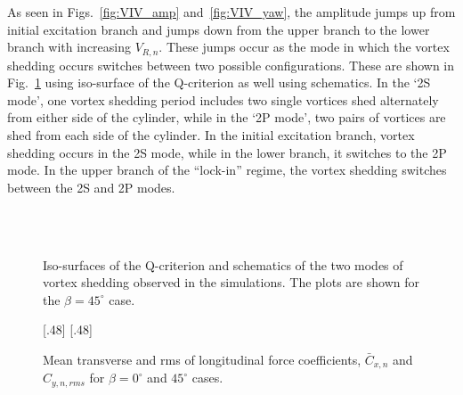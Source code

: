 As seen in Figs.~\ref{fig:VIV_amp} and~\ref{fig:VIV_yaw}, the amplitude jumps
up from initial excitation branch and jumps down from the upper branch to the
lower branch with increasing $V_{R,n}$. These jumps occur as the mode in which
the vortex shedding occurs switches between two possible configurations. These
are shown in Fig.~\ref{fig:VIV_Q} using iso-surface of the Q-criterion as well
using schematics. In the `2S mode', one vortex shedding period includes two
single vortices shed alternately from either side of the cylinder, while in the
`2P mode', two pairs of vortices are shed from each side of the cylinder.  In
the initial excitation branch, vortex shedding occurs in the 2S mode, while in
the lower branch, it switches to the 2P mode. In the upper branch of the
``lock-in'' regime, the vortex shedding switches between the 2S and 2P modes.
%
\begin{figure}[htb!]
   \qquad
   \\
%
   \qquad
   \\
    \caption{Iso-surfaces of the Q-criterion and schematics of the two modes of
      vortex shedding observed in the simulations. The plots are shown for the
      $\beta=45^\circ$ case.}
  \label{fig:VIV_Q}
\end{figure}
%
\begin{figure}[htb!]
    [.48\linewidth]{}
  \hspace*{\fill}
    [.48\linewidth]{}
    \caption{Mean transverse and rms of longitudinal force coefficients, $\bar{C}_{x,n}$ and $C_{y,n,rms}$ for
      $\beta=0^\circ$ and $45^\circ$ cases.}
  \label{fig:force_VIV}
\end{figure}
